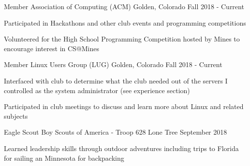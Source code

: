\begin{cventries}

    \ifcv

    \cventry
    {Member}
    {Association of Computing (ACM)}
    {Golden, Colorado}
    {Fall 2018 - Current}
    {
      \begin{cvitems}
        \item Participated in Hackathons and other club events and programming competitions
        \item Volunteered for the High School Programming Competition hosted by Mines to encourage interest in CS@Mines
      \end{cvitems}
    }

    \cventry
    {Member}
    {Linux Users Group (LUG)}
    {Golden, Colorado}
    {Fall 2018 - Current}
    {
      \begin{cvitems}
        \item Interfaced with club to determine what the club needed out of the servers I controlled as the system administrator (see experience section)
        \item {Participated in club meetings to discuss and learn more about Linux and related subjects}
      \end{cvitems}
    }

    \cventry
    {Eagle Scout} %
    {Boy Scouts of America - Troop 628} %
    {Lone Tree} %
    {September 2018} %
    {
      \begin{cvitems} %
        \item {Learned leadership skills through outdoor adventures
            including trips to Florida for sailing an Minnesota for
            backpacking}
      \end{cvitems}
    }
    \fi

\end{cventries}
